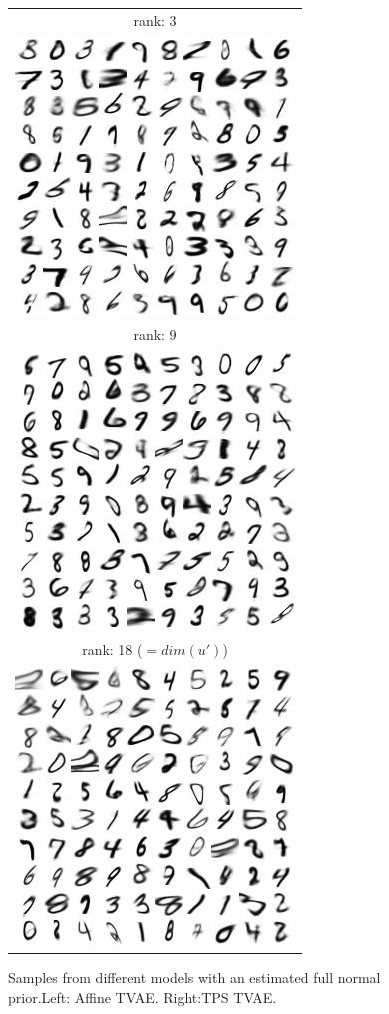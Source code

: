 \documentclass[letterpaper, twoside]{article}
\begin{document}
\begin{figure}[H]
\begin{minipage}{.5\textwidth}
\begin{tabular}{|@{}c@{}|}
\end{tabular}
\end{minipage}%
\begin{minipage}{.5\textwidth}
\centering
\begin{tabular}{|@{}c@{}|}
\hline
rank: 3\\
\includegraphics[scale=1]{manifold_sig_50.jpg}\\ \hline
rank: 9\\
\includegraphics[scale=1]{manifold_sig_51.jpg}\\ \hline
rank: 18 ($=dim(u')$)\\
\includegraphics[scale=1]{manifold_sig_52.jpg}\\ \hline
\end{tabular}
\end{minipage}%
\caption{Samples from different models with an estimated full normal prior.Left: Affine TVAE. Right:TPS TVAE.}
\label{generatedfullprior} 
\end{figure}
\end{document}
